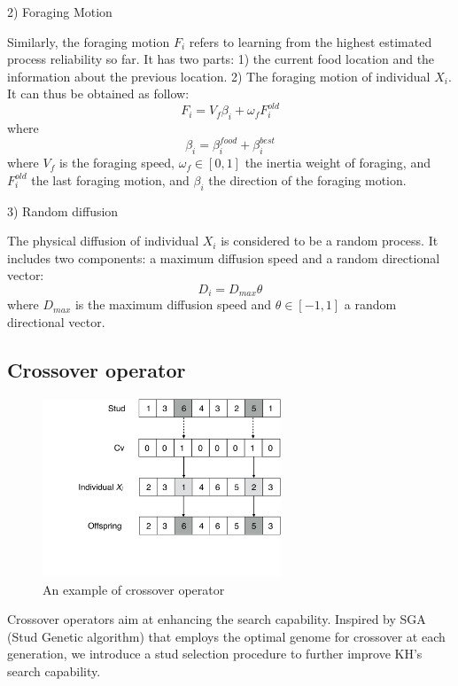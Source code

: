 \documentclass[journal]{IEEEtran}
\begin{document}
2) Foraging Motion

Similarly, the foraging motion $F_i$ refers to learning from the highest estimated process reliability so far. 
It has two parts: 1) the current food location and the information about the previous location. 
2) The foraging motion of individual $X_i$.
It can thus be obtained as follow:
\begin{equation}
F_i = V_f\beta_i + \omega_f F^{old}_i
\end{equation}
where
\begin{equation}
\beta_i = \beta_i^{food}+\beta_i^{best}
\end{equation}
where $V_f$ is the foraging speed, $\omega_f \in [0, 1]$ the inertia weight of foraging, and $F^{old}_i$ the last foraging motion, and $\beta_i$ the direction of the foraging motion.

3) Random diffusion

The physical diffusion of individual $X_i$ is considered to be a random process. It includes two components: a maximum diffusion speed and a random directional vector:
\begin{equation}
D_i = D_{max}\theta
\end{equation}
where $D_{max}$ is the maximum diffusion speed and $\theta \in [-1, 1]$ a random directional vector.

\subsection{Crossover operator}

\begin{figure}[!t]
\centering
\includegraphics[width=2.8in]{./img/pic7.pdf}
\caption{An example of crossover operator}
\label{Crossover operator}
\end{figure}

Crossover operators aim at enhancing the search capability. Inspired by SGA (Stud Genetic algorithm) \cite{wang2014stud} that employs the optimal genome for crossover at each generation, we introduce a stud selection procedure to further improve KH's search capability.
\end{document}
